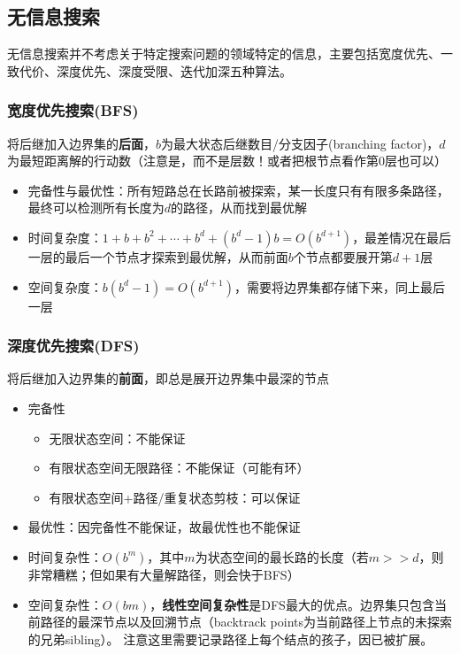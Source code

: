 \subsection{无信息搜索}
无信息搜索并不考虑关于特定搜索问题的领域特定的信息，主要包括宽度优先、一致代价、深度优先、深度受限、迭代加深五种算法。

\subsubsection{宽度优先搜索(BFS)}
将后继加入边界集的\textbf{后面}，$b$为最大状态后继数目/分支因子(branching factor)，$d$为最短距离解的行动数（注意是，而不是层数！或者把根节点看作第$0$层也可以）
\begin{itemize}
	\item 完备性与最优性：所有短路总在长路前被探索，某一长度只有有限多条路径，最终可以检测所有长度为$d$的路径，从而找到最优解
	\item 时间复杂度：$1+b+b^2+\cdots+b^d+(b^d-1)b=O(b^{d+1})$，最差情况在最后一层的最后一个节点才探索到最优解，从而前面$b$个节点都要展开第$d+1$层
	\item 空间复杂度：$b(b^d-1)=O(b^{d+1})$，需要将边界集都存储下来，同上最后一层
\end{itemize}

\subsubsection{深度优先搜索(DFS)}
将后继加入边界集的\textbf{前面}，即总是展开边界集中最深的节点
\begin{itemize}
	\item 完备性
	\begin{itemize}
		\item 无限状态空间：不能保证
		\item 有限状态空间无限路径：不能保证（可能有环）
		\item 有限状态空间+路径/重复状态剪枝：可以保证
	\end{itemize}
	\item 最优性：因完备性不能保证，故最优性也不能保证
	\item 时间复杂性：$O(b^m)$，其中$m$为状态空间的最长路的长度（若$m>>d$，则非常糟糕；但如果有大量解路径，则会快于BFS）
	\item 空间复杂性：$O(bm)$，\textbf{线性空间复杂性}是DFS最大的优点。边界集只包含当前路径的最深节点以及回溯节点（backtrack points为当前路径上节点的未探索的兄弟sibling）。
	注意这里需要记录路径上每个结点的孩子，因已被扩展。
\end{itemize}

